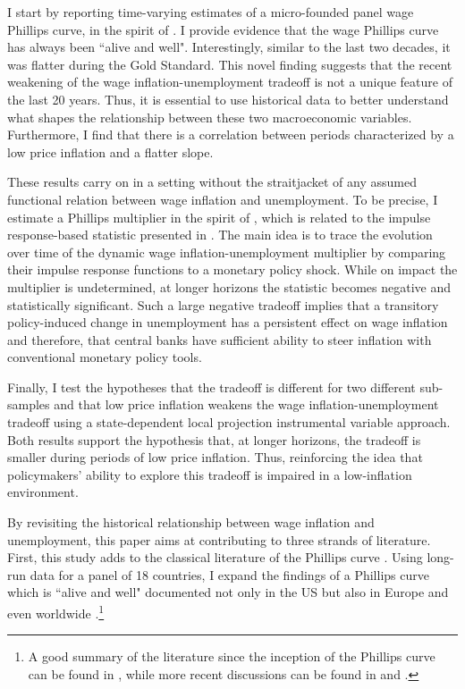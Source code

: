 \documentclass[12pt]{article}
\begin{document}
I start by reporting time-varying estimates of a micro-founded panel wage Phillips curve, in the spirit of \cite{Gali2011}. I provide evidence that the wage Phillips curve has always been ``alive and well". Interestingly, similar to the last two decades, it was flatter during the Gold Standard. This novel finding suggests that the recent weakening of the wage inflation-unemployment tradeoff is not a unique feature of the last 20 years. Thus, it is essential to use historical data to better understand what shapes the relationship between these two macroeconomic variables. Furthermore, I find that there is a correlation between periods characterized by a low price inflation and a flatter slope.

These results carry on in a setting without the straitjacket of any assumed functional relation between wage inflation and unemployment. To be precise, I estimate a Phillips multiplier in the spirit of \cite{Barnichon2019}, which is related to the impulse response-based statistic presented in \cite{Gali2019}. The main idea is to trace the evolution over time of the dynamic wage inflation-unemployment multiplier by comparing their impulse response functions to a monetary policy shock. While on impact the multiplier is undetermined, at longer horizons the statistic becomes negative and statistically significant. Such a large negative tradeoff implies that a transitory policy-induced change in unemployment has a persistent effect on wage inflation and therefore, that central banks have sufficient ability to steer inflation with conventional monetary policy tools.

Finally, I test the hypotheses that the tradeoff is different for two different sub-samples and that low price inflation weakens the wage inflation-unemployment tradeoff using a state-dependent local projection instrumental variable approach. Both results support the hypothesis that, at longer horizons, the tradeoff is smaller during periods of low price inflation. Thus, reinforcing the idea that policymakers' ability to explore this tradeoff is impaired in a low-inflation environment.

By revisiting the historical relationship between wage inflation and unemployment, this paper aims at contributing to three strands of literature. First, this study adds to the classical literature of the Phillips curve \citep{Phillips1958}. Using long-run data for a panel of 18 countries, I expand the findings of a Phillips curve which is ``alive and well" documented not only in the US \citep{Coibion2015, Blanchard2016, Hoynck2020, DelNegro2020, Ascari2021, Hazell2021, Bergholt2023} but also in Europe \citep{Levy2019, Onorante2019, Bonam2021} and even worldwide \citep{Coibion2019}.\footnote{A good summary of the literature since the inception of the Phillips curve can be found in \cite{Gordon2011}, while more recent discussions can be found in \cite{Mavroeidis2014} and \cite{Coibion2018}.} 
\end{document}
